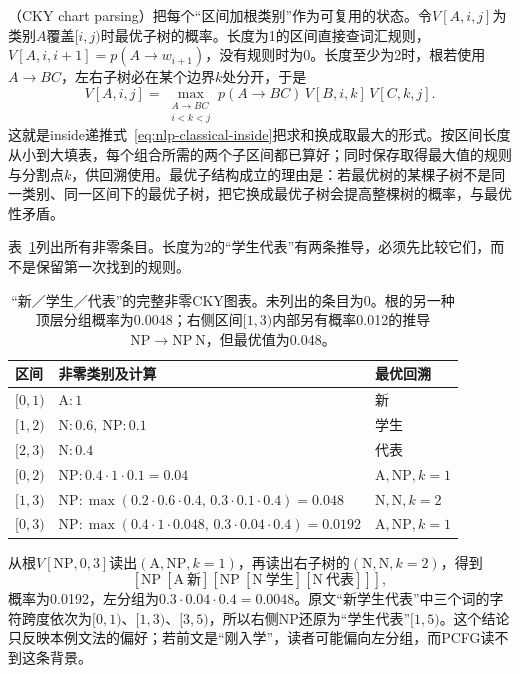 （CKY chart parsing）把每个“区间加根类别”作为可复用的状态。令$V[A,i,j]$为类别$A$覆盖$[i,j)$时最优子树的概率。长度为1的区间直接查词汇规则，$V[A,i,i+1]=p(A\to w_{i+1})$，没有规则时为0。长度至少为2时，根若使用$A\to BC$，左右子树必在某个边界$k$处分开，于是
\begin{equation}
 V[A,i,j]=
 \max_{\substack{A\to BC\\i<k<j}}
 p(A\to BC)\,V[B,i,k]\,V[C,k,j].
 \label{eq:nlp-analysis-pcfg-cky}
\end{equation}
这就是inside递推式~\eqref{eq:nlp-classical-inside}把求和换成取最大的形式。按区间长度从小到大填表，每个组合所需的两个子区间都已算好；同时保存取得最大值的规则与分割点$k$，供回溯使用。最优子结构成立的理由是：若最优树的某棵子树不是同一类别、同一区间下的最优子树，把它换成最优子树会提高整棵树的概率，与最优性矛盾。

表~\ref{tab:nlp-analysis-cky}列出所有非零条目。长度为2的“学生代表”有两条推导，必须先比较它们，而不是保留第一次找到的规则。

\begin{table}[htbp]
  \centering
  \begin{tabularx}{\linewidth}{@{}l X l@{}}
    \toprule
    区间&非零类别及计算&最优回溯\\
    \midrule
    $[0,1)$&$\mathrm A:1$&新\\
    $[1,2)$&$\mathrm N:0.6,\ \mathrm{NP}:0.1$&学生\\
    $[2,3)$&$\mathrm N:0.4$&代表\\
    $[0,2)$&$\mathrm{NP}:0.4\cdot1\cdot0.1=0.04$&$\mathrm A,\mathrm{NP},k=1$\\
    $[1,3)$&$\mathrm{NP}:\max(0.2\cdot0.6\cdot0.4,\,
      0.3\cdot0.1\cdot0.4)=0.048$&$\mathrm N,\mathrm N,k=2$\\
    $[0,3)$&$\mathrm{NP}:\max(0.4\cdot1\cdot0.048,\,
      0.3\cdot0.04\cdot0.4)=0.0192$&$\mathrm A,\mathrm{NP},k=1$\\
    \bottomrule
  \end{tabularx}
  \caption{“新／学生／代表”的完整非零CKY图表。未列出的条目为0。根的另一种顶层分组概率为0.0048；右侧区间$[1,3)$内部另有概率0.012的推导$\mathrm{NP}\to\mathrm{NP}\ \mathrm N$，但最优值为0.048。}
  \label{tab:nlp-analysis-cky}
\end{table}

从根$V[\mathrm{NP},0,3]$读出$(\mathrm A,\mathrm{NP},k=1)$，再读出右子树的$(\mathrm N,\mathrm N,k=2)$，得到
\[
 [\mathrm{NP}\ [\mathrm A\ \text{新}]
       [\mathrm{NP}\ [\mathrm N\ \text{学生}]
                    [\mathrm N\ \text{代表}]]],
\]
概率为0.0192，左分组为$0.3\cdot0.04\cdot0.4=0.0048$。原文“新学生代表”中三个词的字符跨度依次为$[0,1)$、$[1,3)$、$[3,5)$，所以右侧NP还原为“学生代表”$[1,5)$。这个结论只反映本例文法的偏好；若前文是“刚入学”，读者可能偏向左分组，而PCFG读不到这条背景。


